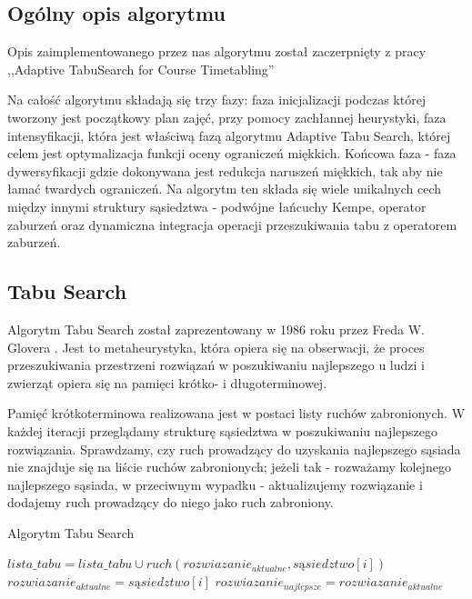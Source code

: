 \subsection{Ogólny opis algorytmu}
\par Opis zaimplementowanego przez nas algorytmu został zaczerpnięty z pracy ,,Adaptive TabuSearch for Course Timetabling'' \cite{tabu}
\par Na całość algorytmu składają się trzy fazy: faza inicjalizacji podczas której tworzony jest początkowy plan zajęć, przy pomocy zachłannej heurystyki, faza intensyfikacji, która jest właściwą fazą algorytmu Adaptive Tabu Search, której celem jest optymalizacja funkcji oceny ograniczeń miękkich. Końcowa faza - faza dywersyfikacji gdzie dokonywana jest redukcja naruszeń miękkich, tak aby nie łamać twardych ograniczeń. Na algorytm ten składa się wiele unikalnych cech między innymi struktury sąsiedztwa - podwójne łańcuchy Kempe, operator zaburzeń oraz dynamiczna integracja operacji przeszukiwania tabu z operatorem zaburzeń.

\subsection{Tabu Search}
\par Algorytm Tabu Search został zaprezentowany w 1986 roku przez Freda W. Glovera \cite{glover}. Jest to metaheurystyka, która opiera się na obserwacji, że proces przeszukiwania przestrzeni rozwiązań w poszukiwaniu najlepszego u ludzi i zwierząt opiera się na pamięci krótko- i długoterminowej. 
\par Pamięć krótkoterminowa realizowana jest w postaci listy ruchów zabronionych. W każdej iteracji przeglądamy strukturę sąsiedztwa w poszukiwaniu najlepszego rozwiązania. Sprawdzamy, czy ruch prowadzący do uzyskania najlepszego sąsiada nie znajduje się na liście ruchów zabronionych; jeżeli tak - rozważamy kolejnego najlepszego sąsiada, w przeciwnym wypadku - aktualizujemy rozwiązanie i dodajemy ruch prowadzący do niego jako ruch zabroniony.

\begin{algorithm}[H]
    \caption{Algorytm Tabu Search}
    \begin{algorithmic}
    	\STATE $lista\_tabu = lista\_tabu \cup ruch(rozwiazanie_{aktualne}, sąsiedztwo[i])$
    	\STATE $rozwiazanie_{aktualne} = sąsiedztwo[i]$
    	\ENDIF
    	\STATE $rozwiazanie_{najlepsze} = rozwiazanie_{aktualne}$
    	\ENDIF
    	
    \ENDFOR
    \ENDWHILE
    \end{algorithmic}
    \end{algorithm}

